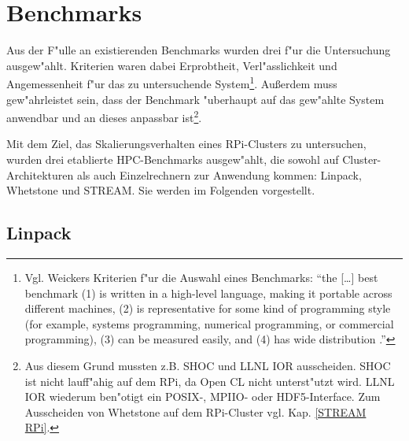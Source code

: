 \section{Benchmarks}\label{Benchmarks}

Aus der F"ulle an existierenden Benchmarks wurden drei f"ur die Untersuchung ausgew"ahlt. Kriterien waren dabei Erprobtheit, Verl"asslichkeit und Angemessenheit f"ur das zu untersuchende System\footnote{Vgl. Weickers Kriterien f"ur die Auswahl eines Benchmarks: "`the [\dots] best benchmark (1) is written in a high-level language, making it portable across different machines, (2) is representative for some kind of programming style (for example, systems programming, numerical programming, or commercial programming), (3) can be measured easily, and (4) has wide distribution \cite{wei90}."'}. Au\ss erdem muss gew"ahrleistet sein, dass der Benchmark "uberhaupt auf das gew"ahlte System anwendbar und an dieses anpassbar ist\footnote{Aus diesem Grund mussten z.B. SHOC und LLNL IOR ausscheiden. SHOC ist nicht lauff"ahig auf dem RPi, da Open CL nicht unterst"utzt wird. LLNL IOR wiederum ben"otigt ein POSIX-, MPIIO- oder HDF5-Interface. Zum Ausscheiden von Whetstone auf dem RPi-Cluster vgl. Kap. \ref{STREAM RPi}.}. 

Mit dem Ziel, das Skalierungsverhalten eines RPi-Clusters zu untersuchen, wurden drei etablierte HPC-Benchmarks ausgew"ahlt, die sowohl auf Cluster-Architekturen als auch Einzelrechnern zur Anwendung kommen: Linpack, Whetstone und STREAM. Sie werden im Folgenden vorgestellt. 

\subsection{Linpack}\label{Linpack}

